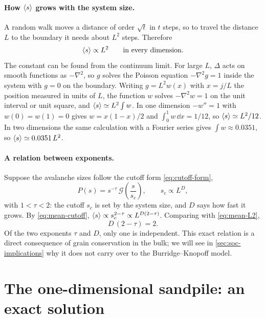 \paragraph{How $\left\langle s \right\rangle$ grows with the system size.} A random walk moves a distance of order $\sqrt{t}$ in $t$ steps,
so to travel the distance $L$ to the boundary it needs about $L^2$ steps. Therefore
\begin{equation}
  \left\langle s \right\rangle\propto L^{2}\qquad\text{in every dimension}.
  \label{eq:mean-L2}
\end{equation}
The constant can be found from the continuum limit. For large $L$, $\Delta$ acts on smooth functions as $-\nabla^2$, so
$g$ solves the Poisson equation $-\nabla^2 g = 1$ inside the system with $g = 0$ on the boundary. Writing $g = L^2 w(x)$
with $x = j/L$ the position measured in units of $L$, the function $w$ solves $-\nabla^2 w = 1$ on the unit interval or
unit square, and $\left\langle s \right\rangle\simeq L^2\int w$. In one dimension $-w'' = 1$ with $w(0)=w(1)=0$ gives $w = x(1-x)/2$ and
$\int_0^1 w\,\dd x = 1/12$, so $\left\langle s \right\rangle\simeq L^2/12$. In two dimensions the same calculation with a Fourier series gives
$\int w \approx 0.0351$, so $\left\langle s \right\rangle\simeq0.0351\,L^2$.

\paragraph{A relation between exponents.} Suppose the avalanche sizes follow the cutoff form \cref{eq:cutoff-form},
\begin{equation}
  P(s) = s^{-\tau}\,\mathcal G\!\left(\frac{s}{s_c}\right),\qquad s_c\propto L^{D},
  \label{eq:fss}
\end{equation}
with $1<\tau<2$: the cutoff $s_c$ is set by the system size, and $D$ says how fast it grows. By \cref{eq:mean-cutoff},
$\left\langle s \right\rangle\propto s_c^{2-\tau}\propto L^{D(2-\tau)}$. Comparing with \cref{eq:mean-L2},
\begin{equation}
  \boxed{\;D\,(2-\tau) = 2.\;}
  \label{eq:scaling-relation}
\end{equation}
Of the two exponents $\tau$ and $D$, only one is independent. This exact relation is a direct consequence of grain
conservation in the bulk; we will see in \cref{sec:soc-implications} why it does not carry over to the
Burridge--Knopoff model.

\section{The one-dimensional sandpile: an exact solution}
\label{sec:btw1d}

